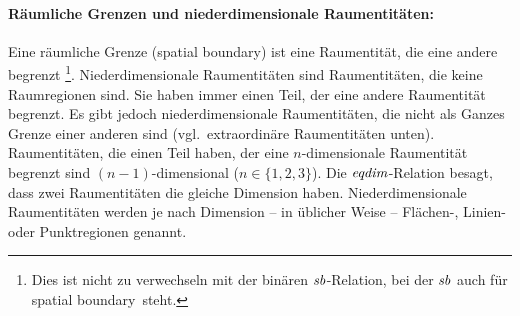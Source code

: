     \paragraph{Räumliche Grenzen und niederdimensionale Raumentitäten:}
        Eine
        räumliche Grenze (spatial boundary) ist eine Raumentität, die eine andere begrenzt%
        \footnote{Dies ist nicht zu verwechseln mit der binären $\mathit{sb}$-Relation, bei der $\mathit{sb}$ auch für \glqq spatial boundary\grqq\ steht.}.
        Niederdimensionale Raumentitäten sind Raumentitäten, die keine Raumregionen sind. 
        Sie haben immer einen Teil, der eine andere Raumentität begrenzt.
        Es gibt jedoch niederdimensionale Raumentitäten, die nicht als Ganzes Grenze einer anderen sind (vgl.\ extraordinäre Raumentitäten unten).
        Raumentitäten, die einen Teil haben, der eine $n$-dimensionale Raumentität begrenzt sind $(n-1)$-dimensional ($n \in \{1,2,3\}$).
        Die $\mathit{eqdim}$-Relation besagt, dass zwei Raumentitäten die gleiche Dimension haben.
        Niederdimensionale Raumentitäten werden je nach Dimension -- in üblicher Weise -- Flächen-, Linien- oder Punktregionen genannt.
        

